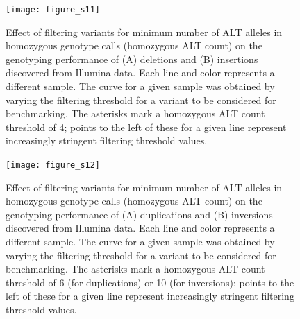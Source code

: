 \documentclass[12pt]{article}
\newenvironment{cfigure}
	{\begin{figure} \centering}
	{\end{figure}}
\begin{document}
\clearpage%

\begin{cfigure}
	\texttt{[image: figure\_s11]}

	\caption[Effect of homozygous ALT count on genotyping performance of Illumina deletions and insertions]{
		Effect of filtering variants for minimum number of ALT alleles in homozygous genotype calls (homozygous ALT count) on the genotyping performance of (A) deletions and (B) insertions discovered from Illumina data.
		Each line and color represents a different sample.
		The curve for a given sample was obtained by varying the filtering threshold for a variant to be considered for benchmarking.
		The asterisks mark a homozygous ALT count threshold of 4; points to the left of these for a given line represent increasingly stringent filtering threshold values.
	}

	\label{fig_s11}

\end{cfigure}

\clearpage%

\begin{cfigure}
	\texttt{[image: figure\_s12]}

	\caption[Effect of homozygous ALT count on genotyping performance of Illumina duplications and inversions]{
		Effect of filtering variants for minimum number of ALT alleles in homozygous genotype calls (homozygous ALT count) on the genotyping performance of (A) duplications and (B) inversions discovered from Illumina data.
		Each line and color represents a different sample.
		The curve for a given sample was obtained by varying the filtering threshold for a variant to be considered for benchmarking.
		The asterisks mark a homozygous ALT count threshold of 6 (for duplications) or 10 (for inversions); points to the left of these for a given line represent increasingly stringent filtering threshold values.
	}

	\label{fig_s12}

\end{cfigure}

\clearpage%
\end{document}
